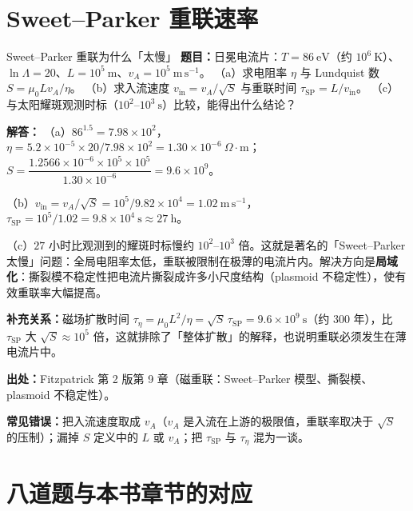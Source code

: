 \section{Sweet--Parker 重联速率}

\begin{example}{Sweet--Parker 重联为什么「太慢」}{}
\textbf{题目：}日冕电流片：$T=86\ \mathrm{eV}$（约 $10^{6}\ \mathrm{K}$）、$\ln\Lambda=20$、$L=10^{5}\ \mathrm{m}$、$v_A=10^{5}\ \mathrm{m\,s^{-1}}$。
（a）求电阻率 $\eta$ 与 Lundquist 数 $S=\mu_0Lv_A/\eta$。
（b）求入流速度 $v_{\mathrm{in}}=v_A/\sqrt{S}$ 与重联时间 $\tau_{\mathrm{SP}}=L/v_{\mathrm{in}}$。
（c）与太阳耀斑观测时标（$10^{2}$--$10^{3}\ \mathrm{s}$）比较，能得出什么结论？

\textbf{解答：}
（a）$86^{1.5}=7.98\times10^{2}$，
$\eta=5.2\times10^{-5}\times20/7.98\times10^{2}=1.30\times10^{-6}\ \Omega\cdot\mathrm{m}$；
$S=\dfrac{1.2566\times10^{-6}\times10^{5}\times10^{5}}{1.30\times10^{-6}}=9.6\times10^{9}$。

（b）$v_{\mathrm{in}}=v_A/\sqrt{S}=10^{5}/9.82\times10^{4}=1.02\ \mathrm{m\,s^{-1}}$，
$\tau_{\mathrm{SP}}=10^{5}/1.02=9.8\times10^{4}\ \mathrm{s}\approx27\ \mathrm{h}$。

（c）$27$ 小时比观测到的耀斑时标慢约 $10^{2}$--$10^{3}$ 倍。这就是著名的「Sweet--Parker 太慢」问题：全局电阻率太低，重联被限制在极薄的电流片内。解决方向是\textbf{局域化}：撕裂模不稳定性把电流片撕裂成许多小尺度结构（plasmoid 不稳定性），使有效重联率大幅提高。

\textbf{补充关系：}磁场扩散时间 $\tau_\eta=\mu_0L^2/\eta=\sqrt{S}\,\tau_{\mathrm{SP}}=9.6\times10^{9}\ \mathrm{s}$（约 300 年），比 $\tau_{\mathrm{SP}}$ 大 $\sqrt{S}\approx10^{5}$ 倍，这就排除了「整体扩散」的解释，也说明重联必须发生在薄电流片中。

{\footnotesize
\textbf{出处：}Fitzpatrick 第 2 版第 9 章（磁重联：Sweet--Parker 模型、撕裂模、plasmoid 不稳定性）。
}

\textbf{常见错误：}把入流速度取成 $v_A$（$v_A$ 是入流在上游的极限值，重联率取决于 $\sqrt{S}$ 的压制）；漏掉 $S$ 定义中的 $L$ 或 $v_A$；把 $\tau_{\mathrm{SP}}$ 与 $\tau_\eta$ 混为一谈。
\end{example}


\section{八道题与本书章节的对应}

